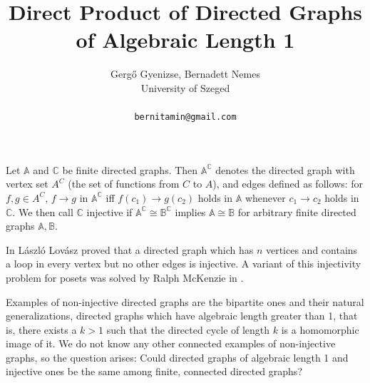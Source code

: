 \documentclass[a4paper]{article} %
\date{} %
\begin{document}
\setcounter{page}{1} %

\title{Direct Product of Directed Graphs of Algebraic Length 1}

\author{Gerg\H{o} Gyenizse, Bernadett Nemes \\ %
       University of Szeged\\ \\ %
       \texttt{bernitamin@gmail.com} %
       }%

\maketitle


Let $\mathbb{A}$ and $\mathbb{C}$ be finite directed graphs. Then $\mathbb{A}^\mathbb{C}$ denotes the directed graph with vertex set $A^C$ (the set of functions from $C$ to $A$), and edges defined as follows: for $f,g\in A^C$, $f\rightarrow g$ in $\mathbb{A}^\mathbb{C}$ iff $f(c_1)\rightarrow g(c_2)$ holds in $\mathbb{A}$ whenever $c_1\rightarrow c_2$ holds in $\mathbb{C}$. We then call $\mathbb{C}$ injective if $\mathbb{A}^{\mathbb{C}}\cong \mathbb{B}^{\mathbb{C}}$ implies $\mathbb{A}\cong \mathbb{B}$ for arbitrary finite directed graphs $\mathbb{A},\mathbb{B}$.

In \cite{BernadettNemes_LL1} L\'{a}szl\'{o} Lov\'{a}sz proved that a directed graph which has $n$ vertices and contains a loop in every vertex but no other edges is injective. A variant of this injectivity problem for posets was solved by Ralph McKenzie in \cite{BernadettNemes_RM}.

Examples of non-injective directed graphs are the bipartite ones and their natural generalizations, directed graphs which have algebraic length greater than 1, that is, there exists a $k>1$ such that the directed cycle of length $k$ is a homomorphic image of it. We do not know any other connected examples of non-injective graphs, so the question arises: Could directed graphs of algebraic length 1 and injective ones be the same among finite, connected directed graphs?  
\end{document}
